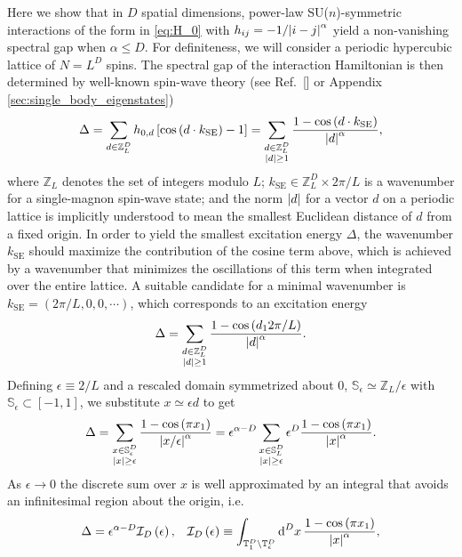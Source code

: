 \documentclass[nofootinbib,notitlepage,11pt]{revtex4-2}
\renewcommand{\t}{\text} %
\newcommand{\f}[2]{\dfrac{#1}{#2}} %
\newcommand{\p}[1]{\left(#1\right)} %
\renewcommand{\sp}[1]{\left[#1\right]} %
\renewcommand{\c}{\cdot} %
\newcommand{\1}{\mathds{1}}
\renewcommand{\d}{\text{d}}
\newcommand{\I}{\mathcal{I}}
\renewcommand{\SS}{\mathbb{S}}
\newcommand{\TT}{\mathbb{T}}
\newcommand{\ZZ}{\mathbb{Z}}
\begin{document}
Here we show that in $D$ spatial dimensions, power-law
SU($n$)-symmetric interactions of the form in \eqref{eq:H_0} with
$h_{ij}=-1/\abs{i-j}^\alpha$ yield a non-vanishing spectral gap when
$\alpha\le D$.  For definiteness, we will consider a periodic
hypercubic lattice of $N=L^D$ spins.  The spectral gap of the
interaction Hamiltonian is then determined by well-known spin-wave
theory (see Ref.~[] or Appendix
\ref{sec:single_body_eigenstates})
\begin{align}
  \Delta
  = \sum_{d\in\ZZ_L^D} h_{0,d} \sp{\cos\p{d \c k_{\t{SE}}}-1}
  = \sum_{\substack{d\in\ZZ_L^D\\\abs{d}\ge1}}
  \f{1-\cos\p{d \c k_{\t{SE}}}}{\abs{d}^\alpha},
\end{align}
where $\ZZ_L$ denotes the set of integers modulo $L$;
$k_{\t{SE}}\in\ZZ_L^D\times2\pi/L$ is a wavenumber for a single-magnon
spin-wave state; and the norm $\abs{d}$ for a vector $d$ on a periodic
lattice is implicitly understood to mean the smallest Euclidean
distance of $d$ from a fixed origin.  In order to yield the smallest
excitation energy $\Delta$, the wavenumber $k_{\t{SE}}$ should
maximize the contribution of the cosine term above, which is achieved
by a wavenumber that minimizes the oscillations of this term when
integrated over the entire lattice.  A suitable candidate for a
minimal wavenumber is $k_{\t{SE}}=\p{2\pi/L,0,0,\cdots}$, which
corresponds to an excitation energy
\begin{align}
  \Delta = \sum_{\substack{d\in\ZZ_L^D\\\abs{d}\ge1}}
  \f{1-\cos\p{d_12\pi/L}}{\abs{d}^\alpha}.
\end{align}
Defining $\epsilon\equiv2/L$ and a rescaled domain symmetrized about
$0$, $\SS_\epsilon\simeq\ZZ_L/\epsilon$ with
$\SS_\epsilon\subset\sp{-1,1}$, we substitute $x\simeq\epsilon d$ to
get
\begin{align}
  \Delta
  = \sum_{\substack{x\in\SS_\epsilon^D\\\abs{x}\ge\epsilon}}
  \f{1-\cos\p{\pi x_1}}{\abs{x/\epsilon}^\alpha}
  = \epsilon^{\alpha-D} \sum_{\substack{x\in\SS_L^D\\\abs{x}\ge\epsilon}}
  \epsilon^D \f{1-\cos\p{\pi x_1}}{\abs{x}^\alpha}.
\end{align}
As $\epsilon\to0$ the discrete sum over $x$ is well approximated by an
integral that avoids an infinitesimal region about the origin, i.e.
\begin{align}
  \Delta = \epsilon^{\alpha-D} \I_D\p{\epsilon},
  &&
  \I_D\p{\epsilon}
  \equiv \int_{\TT_1^D\setminus\TT_\epsilon^D} \d^Dx\,
  \f{1-\cos\p{\pi x_1}}{\abs{x}^\alpha},
\end{align}
\end{document}
